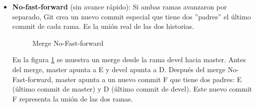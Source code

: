 \documentclass[a4paper,12pt]{report}
\begin{document}
\begin{itemize}
    En la figura \ref{fig:merge_fast_forward} se muestra un merge desde la rama devel hacia master. Antes del merge, master apunta
    a B y devel apunta a E. Después del merge Fast-forward, master también apunta a E, avanzando su puntero
    sin crear un nuevo commit de merge.

  \item \textbf{No-fast-forward} (sin avance rápido):
    Si ambas ramas avanzaron por separado, Git crea un nuevo commit especial que tiene dos ''padres'' el último
    commit de cada rama. Es la unión real de las dos historias.

    \begin{figure}[h]
      \begin{subfigure}[b]{\textwidth}
        \centering
      \end{subfigure}
    
      \begin{subfigure}[b]{\textwidth}
        \centering
      \end{subfigure}
      \caption{Merge No-Fast-forward}
      \label{fig:merge_no_fast_forward}
    \end{figure}

    En la figura \ref{fig:merge_no_fast_forward} se muestra un merge desde la rama devel hacia master. Antes del merge,
    master apunta a E y devel apunta a D. Después del merge No-Fast-forward, master apunta a un nuevo commit F que tiene
    dos padres: E (último commit de master) y D (último commit de devel). Este nuevo commit F representa la unión de las dos ramas.

\end{itemize}
\end{document}
